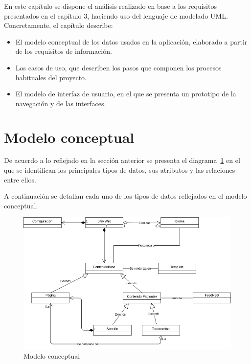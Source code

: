 En este capítulo se dispone el análisis realizado en base a los requisitos presentados
en el capítulo 3, haciendo uso del lenguaje de modelado UML. Concretamente,
el capítulo describe:

\begin{itemize}
\item El modelo conceptual de los datos usados en la aplicación, elaborado a
partir de los requisitos de información.
\item Los casos de uso, que describen los pasos que componen los procesos habituales del proyecto.
\item El modelo de interfaz de usuario, en el que se presenta un prototipo de la
navegación y de las interfaces.
\end{itemize}


\section{Modelo conceptual}

De acuerdo a lo reflejado en la sección anterior se presenta el diagrama~\ref{fig:modelo-conceptual}  en el
que se identifican los principales tipos de datos, sus atributos y las relaciones entre
ellos.

A continuación se detallan cada uno de los tipos de datos reflejados en el modelo
conceptual.

\begin{figure}[htbp]
    \centering
    \includegraphics[width=1.1\textwidth]{4_analisis/modelo_conceptual}
    \caption{Modelo conceptual}
    \label{fig:modelo-conceptual}
\end{figure}

